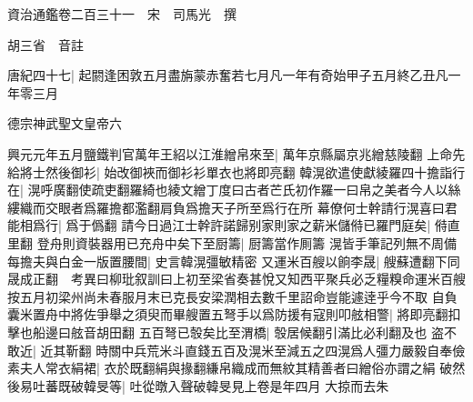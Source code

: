 資治通鑑卷二百三十一　宋　司馬光　撰

胡三省　音註

唐紀四十七|{
	起閼逢困敦五月盡旃蒙赤奮若七月凡一年有奇始甲子五月終乙丑凡一年零三月}


德宗神武聖文皇帝六

興元元年五月鹽鐵判官萬年王紹以江淮繒帛來至|{
	萬年京縣屬京兆繒慈陵翻}
上命先給將士然後御衫|{
	始改御裌而御衫衫單衣也將即亮翻}
韓滉欲遣使獻綾羅四十擔詣行在|{
	滉呼廣翻使疏吏翻羅綺也綾文繒丁度曰古者芒氏初作羅一曰帛之美者今人以絲縷織而交眼者爲羅擔都濫翻肩負爲擔天子所至爲行在所}
幕僚何士幹請行滉喜曰君能相爲行|{
	爲于僞翻}
請今日過江士幹許諾歸别家則家之薪米儲偫已羅門庭矣|{
	偫直里翻}
登舟則資裝器用已充舟中矣下至厨籌|{
	厨籌當作厠籌}
滉皆手筆記列無不周備每擔夫與白金一版置腰間|{
	史言韓滉彊敏精密}
又運米百艘以餉李晟|{
	艘蘇遭翻下同晟成正翻　考異曰柳玭叙訓曰上初至梁省奏甚悅又知西平聚兵必乏糧糗命運米百艘按五月初梁州尚未春服月末已克長安梁潤相去數千里詔命豈能遽逹乎今不取}
自負囊米置舟中將佐爭舉之須臾而畢艘置五弩手以爲防援有寇則叩舷相警|{
	將即亮翻扣擊也船邊曰舷音胡田翻}
五百弩已彀矣比至渭橋|{
	彀居候翻引滿比必利翻及也}
盗不敢近|{
	近其靳翻}
時關中兵荒米斗直錢五百及滉米至減五之四滉爲人彊力嚴毅自奉儉素夫人常衣絹裙|{
	衣於既翻絹與掾翻縑帛織成而無紋其精善者曰繒俗亦謂之絹}
破然後易吐蕃既破韓旻等|{
	吐從暾入聲破韓旻見上卷是年四月}
大掠而去朱

